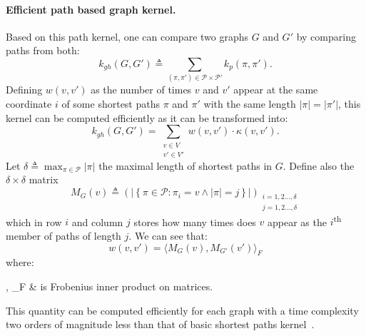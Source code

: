             \paragraph{Efficient path based graph kernel.}
            Based on this path kernel, one can compare two graphs \(G\) and \(G'\) by comparing paths from both:
            \begin{equation}
                \label{eq::graph_hopper_kernel}
                k_{gh}(G, G') \triangleq \sum_{(\pi, \pi') \in \mathscr{P} \times \mathscr{P}'} k_p(\pi, \pi').
            \end{equation}
            Defining \(w(v, v')\) as the number of times \(v\) and \(v'\) appear at the same coordinate \(i\) of some shortest paths \(\pi\) and \(\pi'\) with the same length \(\vert \pi \vert = \vert \pi' \vert\), this kernel can be computed efficiently as it can be transformed into:
            \begin{equation}
                \label{eq::graph_hopper_kernel_second}
                k_{gh}(G, G') = \sum_{\substack{v \in V\\v' \in V'}} w(v, v')\cdot \kappa(v, v').
            \end{equation}
            Let \(\delta \triangleq \max_{\pi \in \mathscr{P}} \vert \pi \vert\) the maximal length of shortest paths in \(G\).
            Define also the \(\delta \times \delta\) matrix
            \begin{equation*}
                M_G(v) \triangleq \left(\left\lvert\left\{\pi \in \mathscr{P}: \pi_i = v \wedge \left\lvert\pi\right\rvert = j \right\}\right\rvert\right)_{\substack{i=1,2\dots,\delta\\j=1,2\dots,\delta}}
            \end{equation*}
            which in row \(i\) and column \(j\) stores how many times does \(v\) appear as the \(i\)\textsuperscript{th} member of paths of length \(j\).
            We can see that:
            \begin{equation}
                \label{eq::w_as_matrix_inner_product}
                w(v, v') = \langle M_G(v), M_{G'}(v')\rangle_F
            \end{equation}
            where:
            \begin{conditions}
                \langle \bullet, \bullet \rangle_F & is Frobenius inner product on matrices.
            \end{conditions}
            This quantity can be computed efficiently for each graph with a time complexity two orders of magnitude less than that of basic shortest paths kernel~\parencite{feragen2013scalable}.

